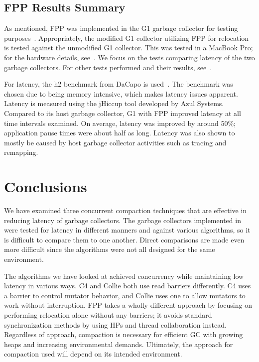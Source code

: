 \documentclass{sig-alternate}
\begin{document}
\subsection{FPP Results Summary}
\label{sec:fppResults}


As mentioned, FPP was implemented in the G1 garbage collector for testing purposes~\cite{Osterlund:FPP}. 
Appropriately, the modified G1 collector utilizing FPP for relocation is tested against the
unmodified G1 collector. This was tested in a MacBook Pro; for the 
hardware details, see~\cite{Osterlund:FPP}. We focus on the tests comparing
latency of the two garbage collectors. For other tests performed and their results, see~\cite{Osterlund:FPP}.

For latency, the h2 benchmark from DaCapo is used~\cite{Blackburn:DaCapo}.
The benchmark was chosen due to being memory intensive,
which makes latency issues apparent.
Latency is measured using the jHiccup tool developed by Azul Systems.
Compared to its host garbage collector, G1 with FPP improved latency at all time
intervals examined. On average, latency was improved by around 50\%; application
pause times were about half as long. Latency was also shown to mostly be caused by 
host garbage collector activities such as tracing and remapping.


\section{Conclusions}
\label{sec:conclusions}

We have examined three concurrent compaction techniques that are 
effective in reducing latency of garbage collectors.
The garbage collectors implemented in were tested for latency in
different manners and against various algorithms, so it is difficult to 
compare them to one another. Direct comparisons are made even more difficult since the
algorithms were not all designed for the same environment.

The algorithms we have looked at achieved concurrency while maintaining low latency in various
ways. C4 and Collie both use read barriers differently. C4 
uses a barrier to control mutator behavior, and Collie uses one to allow mutators to
work without interruption. FPP takes a wholly different approach by focusing on 
performing relocation alone without any barriers; it avoids standard synchronization methods by using HPs
and thread collaboration instead.
Regardless of approach, compaction is necessary for efficient GC with growing heaps and
increasing environmental demands. Ultimately,
the approach for compaction used will depend on its intended environment.
\end{document}
